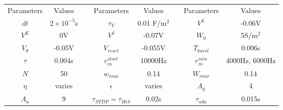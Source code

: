 \begin{center}
\begin{tabular}{|c|c|p{0.5cm}|c|c|p{0.5 cm}|c|c|}
\cline{1-2}\cline{4-5}\cline{7-8}
Parameters & Values & & Parameters & Values& & Parameters& Values\\

\cline{1-2}\cline{4-5}\cline{7-8}
\(dt\) & \(2 \times 10^{-5}\)s& & \(\tau_V\) & 0.01 F/m\(^2\)& &\(V^L\) & -0.06V\\

\cline{1-2}\cline{4-5}\cline{7-8}
\(V^E\) & 0V& & \(V^I\) & -0.07V& & \(W_0\) & 5S/m\(^2\)\\

\cline{1-2}\cline{4-5}\cline{7-8}
\(V_{\theta}\) & -0.05V & & \(V_{reset}\) & -0.055V & & \(T_{burst}\) & 0.006s\\

\cline{1-2}\cline{4-5}\cline{7-8}
\(\tau\) & 0.004s & & \(r_{in}^{start}\) & 10000Hz & & \(r_{in}^{min}\) & 4000Hz, 6000Hz\\

\cline{1-2}\cline{4-5}\cline{7-8}
\(N\) & 50 & & \(w_{max}\) & 0.14 & & \(W_{max}\) & 0.14\\

\cline{1-2}\cline{4-5}\cline{7-8}
\(\eta\) & varies & & \(\epsilon\) & varies & & \(A_g\) & 4\\

\cline{1-2}\cline{4-5}\cline{7-8}
\(A_a\) & 9 & & \(\tau_{STDP}= \tau_{Heb}\) & 0.02s & & \(\tau_{ada}\) & 0.015s\\
\cline{1-2}\cline{4-5}\cline{7-8}
\end{tabular}
\end{center}